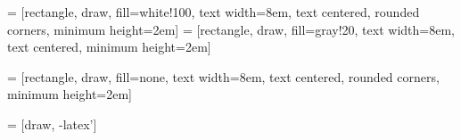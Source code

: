 
\usepackage[portuges, brazil]{babel}
\usepackage[T1]{fontenc}
\usepackage{ae}
\usepackage{pgfgantt}
\usepackage{graphicx}
\usepackage{setspace}
\usepackage{multirow}
\usepackage{mathtools}
\usepackage{amsfonts}
\usepackage{url}
\usepackage{marginnote}
\usepackage{tikz}
\usepackage{makeidx}
\usepackage{circuitikz}
\usepackage{float}
\usepackage[Sonny]{fncychap}
\usepackage{hyperref}
\usepackage[left=2.0cm,right=2.0cm,bottom=2cm,top=2cm]{geometry}
\usepackage{titlesec, blindtext, color}
\newcommand{\hsp}{\hspace{20pt}}
\titleformat{\chapter}[hang]{\Large\bfseries}{\thechapter\hsp\textcolor{gray75}{|}\hsp}{-10pt}{\Large\bfseries}



\titlespacing*{\chapter}{0pt}{-30pt}{20pt}

\onehalfspacing

\usetikzlibrary{calc,trees,positioning,arrows,chains,shapes.geometric,%
decorations.pathreplacing,decorations.pathmorphing,shapes,%
    matrix,shapes.symbols,fit}
     = [rectangle, draw, fill=white!100,
        text width=8em, text centered, rounded corners, minimum
            height=2em]
             = [rectangle, draw, fill=gray!20,
                text width=8em, text centered, minimum height=2em]

                     = [rectangle, draw, fill=none,
                        text width=8em, text centered, rounded corners, minimum
                            height=2em]

                                 = [draw, -latex']

                                \newcommand{\vout}{$V_{\mbox{out}}$}
                                \newcommand{\vin}{$V_{\mbox{in}}$}


